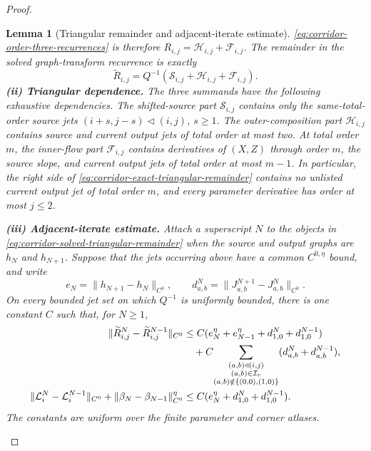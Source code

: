 \documentclass[11pt]{amsart}
\numberwithin{equation}{section}
\newtheorem{lemma}[theorem]{Lemma}
\theoremstyle{definition}
\theoremstyle{remark}
\begin{document}
\begin{proof}
\begin{lemma}[Triangular remainder and adjacent-iterate estimate]
\eqref{eq:corridor-order-three-recurrences} is therefore
$R_{i,j}=\mathcal H_{i,j}+\mathcal F_{i,j}$.  The remainder in the
solved graph-transform recurrence is exactly
\begin{equation}\label{eq:corridor-solved-triangular-remainder}
 \widetilde R_{i,j}
 =Q^{-1}(\mathcal S_{i,j}+\mathcal H_{i,j}+\mathcal F_{i,j}).
\end{equation}
\smallskip
\noindent\textup{\textbf{(ii) Triangular dependence.}}
The three summands have the following exhaustive dependencies.
The shifted-source part $\mathcal S_{i,j}$ contains only the
same-total-order source jets $(i+s,j-s)\triangleleft(i,j)$, $s\ge1$.
The outer-composition part $\mathcal H_{i,j}$ contains source and current
output jets of total order at most two.  At total order $m$, the
inner-flow part $\mathcal F_{i,j}$ contains derivatives of $(X,Z)$
through order $m$, the source slope, and current output jets of total
order at most $m-1$.  In particular, the right side of
\eqref{eq:corridor-exact-triangular-remainder} contains no unlisted
current output jet of total order $m$, and every parameter derivative has
order at most $j\le2$.

\smallskip
\noindent\textup{\textbf{(iii) Adjacent-iterate estimate.}}
Attach a superscript $N$ to the objects in
\eqref{eq:corridor-solved-triangular-remainder} when the source and output
graphs are $h_N$ and $h_{N+1}$.  Suppose that the jets occurring above
have a common $C^{0,\eta}$ bound, and write
\[
 e_N=\|h_{N+1}-h_N\|_{C^0},\qquad
 d_{a,b}^N=\|J_{a,b}^{N+1}-J_{a,b}^{N}\|_{C^0}.
\]
On every bounded jet set on which $Q^{-1}$ is uniformly bounded, there is
one constant $C$ such that, for $N\ge1$,
\begin{align}
 \|\widetilde R_{i,j}^{N}-\widetilde R_{i,j}^{N-1}\|_{C^0}
 &\le C(e_N^\eta+e_{N-1}^\eta
             +d_{1,0}^{N}+d_{1,0}^{N-1})\notag\\
 &\quad+C\!\sum_{\substack{(a,b)\triangleleft(i,j)\\
                       (a,b)\in\mathcal I_r\\
                       (a,b)\notin\{(0,0),(1,0)\}}}
       (d_{a,b}^{N}+d_{a,b}^{N-1}),
 \label{eq:corridor-remainder-adjacent-estimate}\\
 \|\mathcal L_i^N-\mathcal L_i^{N-1}\|_{C^0}
  +\|\beta_N-\beta_{N-1}\|_{C^0}^{\eta}
 &\le C(e_N^\eta+d_{1,0}^{N}+d_{1,0}^{N-1}).
 \label{eq:corridor-coefficient-adjacent-estimate}
\end{align}
The constants are uniform over the finite parameter and corner atlases.
\end{lemma}


\end{proof}
\end{document}
